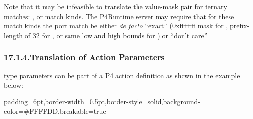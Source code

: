 \documentclass[11pt]{article}
\begin{document}
{%
Note that it may be infeasible to translate the value-mask pair for ternary
matches: ,  or  match kinds.  The P4Runtime server may
require that for these match kinds the port match be either \emph{de facto} \textquotedblleft{}exact\textquotedblright{}
(0xffffffff mask for , prefix-length of 32 for , or same low and
high bounds for ) or \textquotedblleft{}don't care\textquotedblright{}.%

\subsubsection{17.1.4.\hspace*{0.5em}Translation of Action Parameters}\label{sec-translation-of-action-parameters}%

\noindent{} type parameters can be part of a P4 action definition as shown in the
example below:%

\begin{mdbmargintb}{6pt}{6pt}%
\begin{mdblock}{padding=6pt,border-width=0.5pt,border-style=solid,background-color=\#FFFFDD,breakable=true}%
\begin{mdpre}%
\end{mdpre}%
\end{mdblock}%
\end{mdbmargintb}%

}
\end{document}
